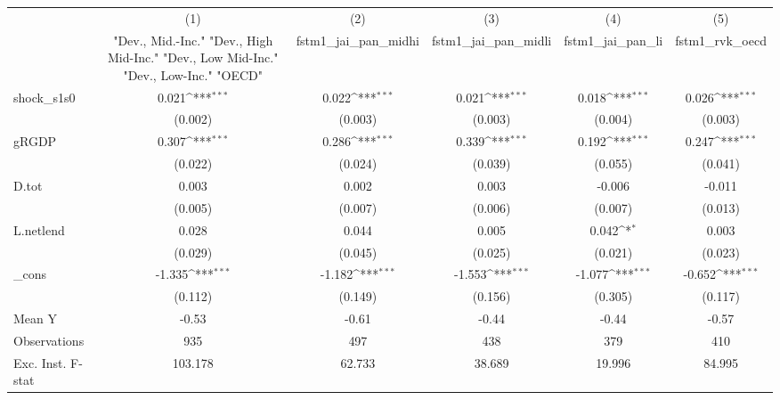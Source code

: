 {
\def\sym#1{\ifmmode^{#1}\else\(^{#1}\)\fi}
\begin{tabular}{l*{5}{c}}
\toprule
            &\multicolumn{1}{c}{(1)}&\multicolumn{1}{c}{(2)}&\multicolumn{1}{c}{(3)}&\multicolumn{1}{c}{(4)}&\multicolumn{1}{c}{(5)}\\
            &\multicolumn{1}{c}{ "Dev., Mid.-Inc." "Dev., High Mid-Inc." "Dev., Low Mid-Inc." "Dev., Low-Inc." "OECD" }&\multicolumn{1}{c}{fstm1\_jai\_pan\_midhi}&\multicolumn{1}{c}{fstm1\_jai\_pan\_midli}&\multicolumn{1}{c}{fstm1\_jai\_pan\_li}&\multicolumn{1}{c}{fstm1\_rvk\_oecd}\\
\midrule
shock\_s1s0  &       0.021\sym{***}&       0.022\sym{***}&       0.021\sym{***}&       0.018\sym{***}&       0.026\sym{***}\\
            &     (0.002)         &     (0.003)         &     (0.003)         &     (0.004)         &     (0.003)         \\
\addlinespace
gRGDP       &       0.307\sym{***}&       0.286\sym{***}&       0.339\sym{***}&       0.192\sym{***}&       0.247\sym{***}\\
            &     (0.022)         &     (0.024)         &     (0.039)         &     (0.055)         &     (0.041)         \\
\addlinespace
D.tot       &       0.003         &       0.002         &       0.003         &      -0.006         &      -0.011         \\
            &     (0.005)         &     (0.007)         &     (0.006)         &     (0.007)         &     (0.013)         \\
\addlinespace
L.netlend   &       0.028         &       0.044         &       0.005         &       0.042\sym{*}  &       0.003         \\
            &     (0.029)         &     (0.045)         &     (0.025)         &     (0.021)         &     (0.023)         \\
\addlinespace
\_cons      &      -1.335\sym{***}&      -1.182\sym{***}&      -1.553\sym{***}&      -1.077\sym{***}&      -0.652\sym{***}\\
            &     (0.112)         &     (0.149)         &     (0.156)         &     (0.305)         &     (0.117)         \\
\midrule
Mean Y      &       -0.53         &       -0.61         &       -0.44         &       -0.44         &       -0.57         \\
Observations&         935         &         497         &         438         &         379         &         410         \\
Exc. Inst. F-stat&     103.178         &      62.733         &      38.689         &      19.996         &      84.995         \\
\bottomrule
\end{tabular}
}
